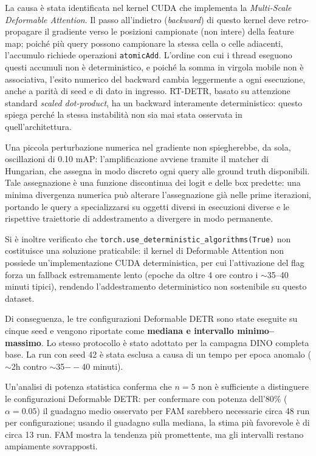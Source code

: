 \documentclass[a4paper,11pt]{article}
\begin{document}
La causa è stata identificata nel kernel CUDA che implementa la \textit{Multi-Scale Deformable Attention}. Il passo all'indietro (\textit{backward}) di questo kernel deve retro-propagare il gradiente verso le posizioni campionate (non intere) della feature map; poiché più query possono campionare la stessa cella o celle adiacenti, l'accumulo richiede operazioni \texttt{atomicAdd}. L'ordine con cui i thread eseguono questi accumuli non è deterministico, e poiché la somma in virgola mobile non è associativa, l'esito numerico del backward cambia leggermente a ogni esecuzione, anche a parità di seed e di dato in ingresso. RT-DETR, basato su attenzione standard \textit{scaled dot-product}, ha un backward interamente deterministico: questo spiega perché la stessa instabilità non sia mai stata osservata in quell'architettura.

Una piccola perturbazione numerica nel gradiente non spiegherebbe, da sola, oscillazioni di 0.10 mAP: l'amplificazione avviene tramite il matcher di Hungarian, che assegna in modo discreto ogni query alle ground truth disponibili. Tale assegnazione è una funzione discontinua dei logit e delle box predette: una minima divergenza numerica può alterare l'assegnazione già nelle prime iterazioni, portando le query a specializzarsi su oggetti diversi in esecuzioni diverse e le rispettive traiettorie di addestramento a divergere in modo permanente.

Si è inoltre verificato che \texttt{torch.use\_deterministic\_algorithms(True)} non costituisce una soluzione praticabile: il kernel di Deformable Attention non possiede un'implementazione CUDA deterministica, per cui l'attivazione del flag forza un fallback estremamente lento (epoche da oltre 4 ore contro i $\sim$35--40 minuti tipici), rendendo l'addestramento deterministico non sostenibile su questo dataset.

Di conseguenza, le tre configurazioni Deformable DETR sono state eseguite su cinque seed e vengono riportate come \textbf{mediana e intervallo minimo--massimo}. Lo stesso protocollo è stato adottato per la campagna DINO completa base. La run con seed 42 è stata esclusa a causa di un tempo per epoca anomalo ($\sim$2h contro $\sim$35$--$40 minuti).

Un'analisi di potenza statistica conferma che $n=5$ non è sufficiente a distinguere le configurazioni Deformable DETR: per confermare con potenza dell'80\% ($\alpha=0.05$) il guadagno medio osservato per FAM sarebbero necessarie circa 48 run per configurazione; usando il guadagno sulla mediana, la stima più favorevole è di circa 13 run. FAM mostra la tendenza più promettente, ma gli intervalli restano ampiamente sovrapposti.
\end{document}
